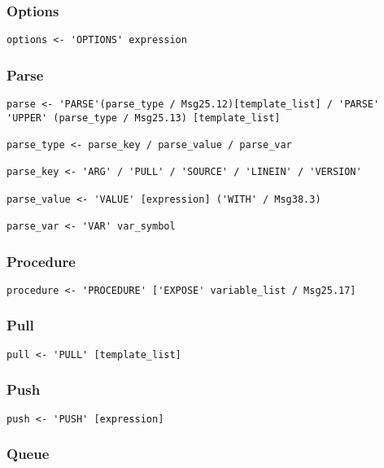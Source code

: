 \subsubsection{Options}

\begin{verbatim}
options <- 'OPTIONS' expression
\end{verbatim}

\subsubsection{Parse}

\begin{verbatim}
parse <- 'PARSE'(parse_type / Msg25.12)[template_list] / 'PARSE' 'UPPER' (parse_type / Msg25.13) [template_list]

parse_type <- parse_key / parse_value / parse_var

parse_key <- 'ARG' / 'PULL' / 'SOURCE' / 'LINEIN' / 'VERSION'

parse_value <- 'VALUE' [expression] ('WITH' / Msg38.3)

parse_var <- 'VAR' var_symbol
\end{verbatim}

\subsubsection{Procedure}

\begin{verbatim}
procedure <- 'PROCEDURE' ['EXPOSE' variable_list / Msg25.17]
\end{verbatim}

\subsubsection{Pull}

\begin{verbatim}
pull <- 'PULL' [template_list]
\end{verbatim}

\subsubsection{Push}

\begin{verbatim}
push <- 'PUSH' [expression]
\end{verbatim}

\subsubsection{Queue}

